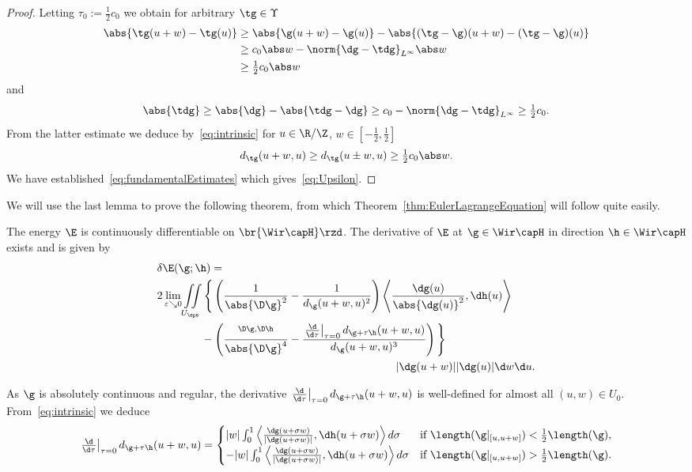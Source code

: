\begin{proof}
Letting $\tau_0:=\tfrac12 c_0$ we obtain
for arbitrary $\tg\in \Upsilon$
\begin{align*}
 \abs{\tg(u+w)-\tg(u)} &\ge \abs{\g(u+w)-\g(u)} - \abs{(\tg-\g)(u+w)-(\tg-\g)(u)} \\
 &\ge c_0\abs w-\norm{\dg-\tdg}_{L^\infty}\abs w \\
 &\ge \tfrac12c_0\abs w
\end{align*}
and
\[ \abs{\tdg}\ge\abs{\dg}-\abs{\tdg-\dg}\ge c_0-\norm{\dg-\tdg}_{L^\infty}\ge\tfrac12c_0. \]
From the latter estimate
we deduce by~\eqref{eq:intrinsic} for $u\in\R/\Z$, $w\in[-\tfrac12,\tfrac12]$
\[ d_{\tg}(u+w,u) \ge d_{\tg}(u\pm w,u) \ge \tfrac12c_0\abs w. \]
We have established~\eqref{eq:fundamentalEstimates} which gives~\eqref{eq:Upsilon}.
\end{proof}

We will use the last lemma to prove the following theorem, from which 
Theorem~\ref{thm:EulerLagrangeEquation} will follow quite easily.

\begin{proposition}\label{prop:formula}
  The energy $\E$ is continuously differentiable on $\br{\Wir\capH}\rzd$.
  The derivative of $\E$ at $\g \in {\Wir\capH}$ in direction $\h \in {\Wir\capH}$ exists and
  is given by
  \begin{equation}\label{eq:formulaD}
  \begin{split}
    &\delta\E(\g;\h)  = \\
    &2\lim_{\varepsilon \searrow 0} \iint\limits_{U_\eps} \Bigg\{
    \left(
      \frac 1 {\abs{\D\g}^2}-\frac 1 {d_\g(u+w,u)^2} \right)
      \left\langle \frac{\dg(u)}{\abs{\dg(u)}^2},\dh(u) \right\rangle 
\\
    &\qquad\qquad {}-
      \left( \frac{\sp{\D\g,\D\h}}{\abs{\D\g}^{4}}
	-\frac{ \left.\tfrac{\d}{\d\tau}\right|_{\tau=0}d_{\g+\tau\h}(u+w,u)}
		{d_\g(u+w,u)^{3}} \right)\Bigg\} 
\\ &\hspace{7.6cm} |\dg(u+w)| |\dg(u)|\d w\d u .
  \end{split}
  \end{equation}
\end{proposition}

As $\g$ is absolutely continuous and regular, the derivative 
$\left.\tfrac{\d}{\d\tau}\right|_{\tau=0}d_{\g+\tau\h}(u+w,u)$ is well-defined for almost all
$(u,w) \in U_0$. From~\eqref{eq:intrinsic} we deduce
\begin{multline}\label{eq:dd} 
 \left.\tfrac{\d}{\d\tau}\right|_{\tau=0} d_{\g+\tau\h} (u+w,u) =
 \begin{cases} |w|\int_{0}^1 
    \left\langle \frac {\dg(u+\sigma w)}{|\dg(u+\sigma w)|} , \dh(u+\sigma w) \right\rangle d\sigma
    &\text{if } \length(\g|_{[u,u+w]}) <\frac 1 2 \length(\g),\\
    -|w|\int_{0}^1
    \left\langle  \frac {\dg(u+\sigma w)}{|\dg(u+\sigma w)|} , \dh(u+\sigma w) \right\rangle d\sigma
    &\text{if } \length(\g|_{[u,u+w]}) > \frac 1 2 \length(\g).
    \end{cases}
\end{multline}

